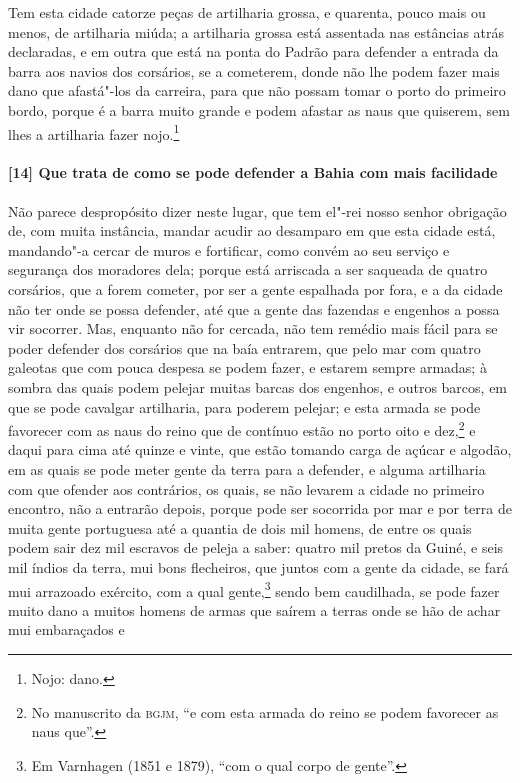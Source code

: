 \begin{linenumbers}
Tem esta cidade catorze peças de artilharia grossa, e quarenta, pouco mais ou menos, de
artilharia miúda; a artilharia grossa está assentada nas estâncias atrás declaradas, e em
outra que está na ponta do Padrão para defender a entrada da barra aos navios dos
corsários, se a cometerem, donde não lhe podem fazer mais dano que afastá"-los da carreira,
para que não possam tomar o porto do primeiro bordo, porque é a barra muito grande e podem
afastar as naus que quiserem, sem lhes a artilharia fazer nojo.\footnote{ Nojo: dano.}


\paragraph{[14] Que trata de como se pode defender a Bahia com mais facilidade} \quad
Não parece despropósito dizer neste lugar, que tem el"-rei nosso senhor obrigação de, com
muita instância, mandar acudir ao desamparo em que esta cidade está, mandando"-a cercar de
muros e fortificar, como convém ao seu serviço e segurança dos moradores dela; porque está
arriscada a ser saqueada de quatro corsários, que a forem cometer, por ser a gente
espalhada por fora, e a da cidade não ter onde se possa defender, até que a gente das
fazendas e engenhos a possa vir socorrer. Mas, enquanto não for cercada, não tem remédio
mais fácil para se poder defender dos corsários que na baía entrarem, que pelo mar com
quatro galeotas que com pouca despesa se podem fazer, e estarem sempre armadas; à sombra
das quais podem pelejar muitas barcas dos engenhos, e outros barcos, em que se pode
cavalgar artilharia, para poderem pelejar; e esta armada se pode favorecer com as naus do
reino que de contínuo estão no porto oito e dez,\footnote{ No manuscrito da \textsc{bgjm},
``e com esta armada do reino se podem favorecer as naus que''.} e daqui para cima até
quinze e vinte, que estão tomando carga de açúcar e algodão, em as quais se pode meter
gente da terra para a defender, e alguma artilharia com que ofender aos contrários, os
quais, se não levarem a cidade no primeiro encontro, não a entrarão depois, porque pode
ser socorrida por mar e por terra de muita gente portuguesa até a quantia de dois mil
homens, de entre os quais podem sair dez mil escravos de peleja a saber: quatro mil pretos
da Guiné, e seis mil índios da terra, mui bons flecheiros, que juntos com a gente da
cidade, se fará mui arrazoado exército, com a qual gente,\footnote{ Em Varnhagen (1851 e
1879), ``com o qual corpo de gente''.} sendo bem caudilhada, se pode fazer muito dano a
muitos homens de armas que saírem a terras onde se hão de achar mui embaraçados e

\end{linenumbers}
